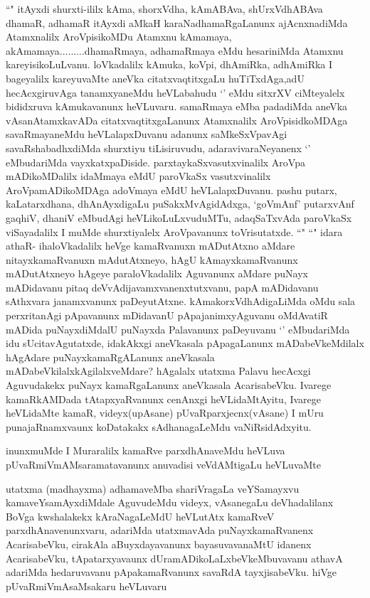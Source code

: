 \begin{artha}
``\stext" itAyxdi shurxti-ililx kAma, shorxVdha, kAmABAva, shUrxVdhABAva dhamaR, adhamaR itAyxdi aMkaH karaNadhamaRgaLanunx ajAcnxnadiMda Atamxnalilx AroVpisikoMDu Atamxnu kAmamaya, akAmamaya.........dhamaRmaya, adhamaRmaya eMdu hesariniMda Atamxnu kareyisikoLuLvanu. loVkadalilx kAmuka, koVpi, dhAmiRka, adhAmiRka I bageyalilx kareyuvaMte aneVka citatxvaqtitxgaLu huTiTxdAga,adU hecAcxgiruvAga tanamxyaneMdu heVLabahudu `\stext' eMdu sitxrXV ciMteyalelx bididxruva kAmukavanunx heVLuvaru. samaRmaya eMba padadiMda aneVka vAsanAtamxkavADa citatxvaqtitxgaLanunx Atamxnalilx AroVpisidkoMDAga savaRmayaneMdu heVLalapxDuvanu adanunx saMkeSxVpavAgi savaRshabadhxdiMda shurxtiyu tiLisiruvudu, adaravivaraNeyanenx `\stext' eMbudariMda vayxkatxpaDiside. parxtaykaSxvasutxvinalilx AroVpa mADikoMDalilx idaMmaya eMdU paroVkaSx vasutxvinalilx AroVpamADikoMDAga adoVmaya eMdU heVLalapxDuvanu. pashu putarx, kaLatarxdhana, dhAnAyxdigaLu puSakxMvAgidAdxga, `goVmAnf' putarxvAnf gaqhiV, dhaniV eMbudAgi heVLikoLuLxvuduMTu, adaqSaTxvAda paroVkaSx viSayadalilx I muMde shurxtiyalelx AroVpavanunx toVrisutatxde. ``\stext" ``\stext" idara athaR- ihaloVkadalilx heVge kamaRvanuxn mADutAtxno aMdare nitayxkamaRvanuxn mAdutAtxneyo, hAgU kAmayxkamaRvanunx mADutAtxneyo hAgeye paraloVkadalilx Aguvanunx aMdare puNayx mADidavanu pitaq deVvAdijavamxvanenxtutxvanu, papA mADidavanu sAthxvara janamxvanunx paDeyutAtxne. kAmakorxVdhAdigaLiMda oMdu sala perxritanAgi pApavanunx mDidavanU pApajanimxyAguvanu oMdAvatiR mADida puNayxdiMdalU puNayxda Palavanunx paDeyuvanu `\stext' eMbudariMda idu sUcitavAgutatxde, idakAkxgi aneVkasala pApagaLanunx mADabeVkeMdilalx hAgAdare puNayxkamaRgALanunx aneVkasala mADabeVkilalxkAgilalxveMdare? hAgalalx utatxma Palavu hecAcxgi Aguvudakekx puNayx kamaRgaLanunx aneVkasala AcarisabeVku. Ivarege kamaRkAMDada tAtapxyaRvanunx cenAnxgi heVLidaMtAyitu, Ivarege heVLidaMte kamaR, videyx(upAsane) pUvaRparxjecnx(vAsane) I mUru punajaRnamxvaunx koDatakakx sAdhanagaLeMdu vaNiRsidAdxyitu. 
\end{artha}

\begin{artha}
inunxmuMde I Muraralilx kamaRve parxdhAnaveMdu heVLuva pUvaRmiVmAMsaramatavanunx anuvadisi veVdAMtigaLu heVLuvaMte
\end{artha}

\begin{artha}
utatxma (madhayxma) adhamaveMba shariVragaLa veYSamayxvu kamaveYsamAyxdiMdale AguvudeMdu videyx, vAsanegaLu deVhadalilanx BoVga kwshalakekx kAraNagaLeMdU heVLutAtx kamaRveV parxdhAnavenunxvaru, adariMda utatxmavAda puNayxkamaRvanenx AcarisabeVku, cirakAla aBuyxdayavanunx bayasuvavanaMtU idanenx AcarisabeVku, tApatarxyavaunx dUramADikoLaLxbeVkeMbuvavanu athavA adariMda hedaruvavanu pApakamaRvanunx savaRdA tayxjisabeVku. hiVge pUvaRmiVmAsaMsakaru heVLuvaru
\end{artha}


